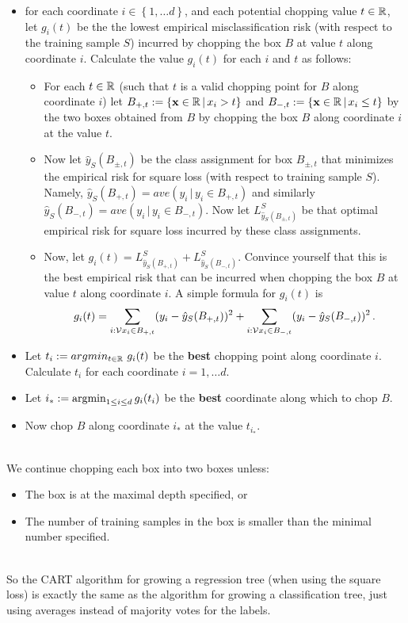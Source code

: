  \begin{itemize}
  \item for each coordinate $i\in\left\{ 1,\ldots d \right\}$, and each
    potential chopping value $t\in\mathbb{R}$, let $g_i(t)$ be the 
    the lowest empirical misclassification risk (with respect to the training
    sample $S$) incurred by
      chopping the box $B$ at value $t$ along coordinate $i$.
      Calculate the value $g_i(t)$ for each $i$ and $t$ as follows: 
    \begin{itemize}
      \item For each $t\in\mathbb{R}$ (such that $t$ is a valid chopping point for
	$B$ along coordinate $i$) let 
	$B_{+,t} := \left\{ \mathbf{x}\in\mathbb{R}\,|\, x_{i}>t \right\}$ 
	and 
	$B_{-,t} := \left\{ \mathbf{x}\in\mathbb{R}\,|\, x_{i}\leq t \right\}$ 
	by the two boxes obtained from $B$ by chopping the box $B$ along
	coordinate $i$ at the value $t$. 
      \item Now let $\hat{y}_S(B_{\pm,t})$ be the class assignment
	for box $B_{\pm,t}$ that minimizes the empirical  risk for square loss (with respect to
        training sample $S$). Namely, $\hat{y}_S(B_{+,t})=
        ave(y_i\,|\, y_i\in B_{+,t})$ and similarly 
        $\hat{y}_S(B_{-,t})=
        ave(y_i\,|\, y_i\in B_{-,t})$. Now 
      let
        $L^S_{\hat{y}_S(B_{\pm,t})}$ be that optimal empirical
        risk for square loss incurred by these class assignments.
    \item Now, let $g_i(t) = L^S_{\hat{y}_S(B_{+,t})} +
      L^S_{\hat{y}_S(B_{-,t})}$. Convince yourself that this is
      the best empirical risk that can be incurred when
      chopping the box $B$ at value $t$ along coordinate $i$. 
      A simple formula for $g_i(t)$ is 
      \[
        g_i(t) = \sum_{i:\mathcal{V}{x}_i\in B_{+,t}} (y_i-\hat{y}_S(B_{+,t}))^2 
        + \sum_{i:\mathcal{V}{x}_i\in B_{-,t}} (y_i-\hat{y}_S(B_{-,t}))^2  \,.
      \]
    \end{itemize}

  \item Let $t_i := argmin_{t\in\mathbb{R}}\,\, g_i(t)$ be the {\bf best} chopping point along
    coordinate $i$. Calculate $t_i$ for each coordinate $i=1,\ldots d$.
  \item Let $i_* := \operatorname*{argmin}_{1\leq i \leq d} g_i(t_i)$ be the {\bf best} coordinate along which to chop $B$.
  \item Now chop $B$ along coordinate $i_*$ at the value $t_{i_*}$.
\end{itemize}
~\\
We continue chopping each box into two boxes unless:
\begin{itemize}
  \item The box is at the maximal depth specified, or
  \item The number of training samples in the box is smaller than the minimal
    number specified.
\end{itemize}
~\\
So the CART algorithm for growing a regression tree (when using the square loss)
is exactly the same as the
algorithm for growing a classification tree, just using averages instead of
majority votes for the labels.


